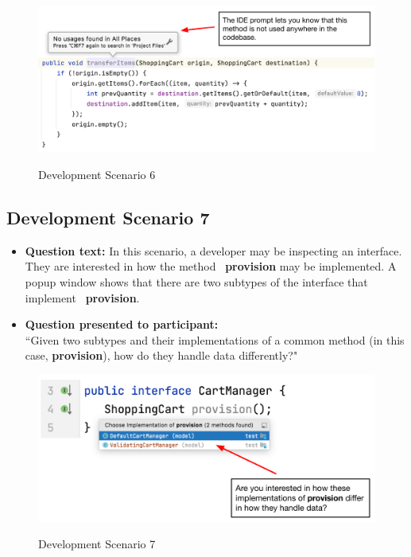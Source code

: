 \begin{figure}[ht]
\centering
\caption{Development Scenario 6}
\includegraphics[width=\textwidth]{./figs/ds6.png}
\label{fig:DS6}
\end{figure}

\subsection{Development Scenario 7}

\begin{itemize}
  \item[] \textbf{Question text:} In this scenario, a developer may be 
          inspecting an interface. They are interested in how the method 
          \textbf{provision} may be implemented. A popup window shows that 
          there are two subtypes of the interface that implement 
          \textbf{provision}.
  \item[] \textbf{Question presented to participant:}  \\
          ``Given two subtypes and their implementations of a common method 
          (in this case, \textbf{provision}), how do they handle data 
          differently?"
\end{itemize}

\begin{figure}[ht]
\centering
\caption{Development Scenario 7}
\includegraphics[width=\textwidth]{./figs/ds7.png}
\label{fig:DS7}
\end{figure}

